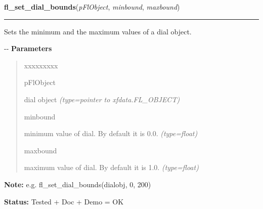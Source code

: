 \hspace{.8\funcindent}\begin{boxedminipage}{\funcwidth}

    \raggedright \textbf{fl\_set\_dial\_bounds}(\textit{pFlObject}, \textit{minbound}, \textit{maxbound})

    \vspace{-1.5ex}

    \rule{\textwidth}{0.5\fboxrule}
\setlength{\parskip}{2ex}

Sets the minimum and the maximum values of a dial object.

-{}-
\setlength{\parskip}{1ex}
      \textbf{Parameters}
      \vspace{-1ex}

      \begin{quote}
        \begin{Ventry}{xxxxxxxxx}

          \item[pFlObject]


dial object
            {\it (type=pointer to xfdata.FL\_OBJECT)}

          \item[minbound]


minimum value of dial. By default it is 0.0.
            {\it (type=float)}

          \item[maxbound]


maximum value of dial. By default it is 1.0.
            {\it (type=float)}

        \end{Ventry}

      \end{quote}

\textbf{Note:} 
e.g. fl\_set\_dial\_bounds(dialobj, 0, 200)


\textbf{Status:} 
Tested + Doc + Demo = OK


    \end{boxedminipage}

    \label{xformslib:fldial:fl_get_dial_bounds}

    \vspace{0.5ex}

